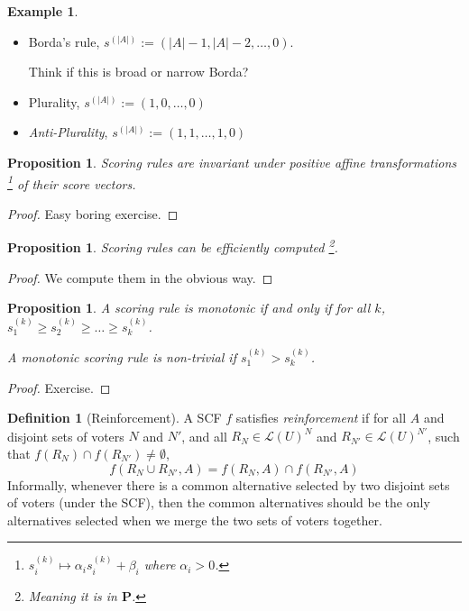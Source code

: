 \documentclass{book}
\newcommand{\unclear}[1]{%
  \par\noindent
  \colorbox{yellow!30}{#1}\par
}
\theoremstyle{plain}
\newtheorem{proposition}[theorem]{Proposition}
\theoremstyle{definition}
\newtheorem{definition}[theorem]{Definition}
\newtheorem{example}[theorem]{Example}
\theoremstyle{remark}
\begin{document}
\begin{example}
    \leavevmode \\
    \begin{itemize}
        \item 
        Borda's rule, 
        $s^{(|A|)} := (|A| - 1, |A| - 2, \ldots, 0)$.
        \unclear{Think if this is broad or narrow Borda?}

        \item Plurality, $s^{(|A|)} := (1, 0, \dots, 0)$
        
        \item \emph{Anti-Plurality}, 
        $s^{(|A|)} := (1, 1, \ldots, 1, 0)$
    \end{itemize}
\end{example}

\begin{proposition}\label{p:scoring-rules-affine}
    Scoring rules are 
    invariant under \emph{positive affine transformations}
    \footnote{$s_i^{(k)} \mapsto \alpha_i s_i^{(k)} + \beta_i$ where $\alpha_i > 0$.}
    of their score vectors.
\end{proposition}
\begin{proof}
    Easy boring exercise.
\end{proof}

\begin{proposition}
    Scoring rules can be efficiently computed \footnote{Meaning it is in $\mathbf{P}$.}.
\end{proposition}
\begin{proof}
    We compute them in the obvious way.
\end{proof}

\begin{proposition}
    A scoring rule is monotonic 
    if and only if 
    for all $k$, $s_1^{(k)} \geq s_2^{(k)} \geq \ldots \geq s_k^{(k)}$.

    A monotonic 
    scoring rule is \emph{non-trivial}
    if $s_1^{(k)} > s_k^{(k)}$.
\end{proposition}
\begin{proof}
    Exercise.
\end{proof}

\begin{definition}[Reinforcement]
    A SCF $f$ satisfies \emph{reinforcement}
    if for all $A$ and 
    disjoint sets 
    of voters $N$ and $N'$,
    and all 
    $R_N \in \mathcal{L}(U)^N$ and $R_{N'} \in \mathcal{L}(U)^{N'}$,
    such that 
    $f(R_N) \cap f(R_{N'}) \neq \emptyset$, 
    \[
        f(R_N \cup R_{N'}, A) = f(R_N, A) \cap f(R_{N'}, A)
    \]
    Informally, 
    whenever there is a common alternative selected by two disjoint sets 
    of voters (under the SCF), 
    then the common alternatives should be the only
    alternatives selected when we merge the two sets of voters together.
\end{definition}
\end{document}
